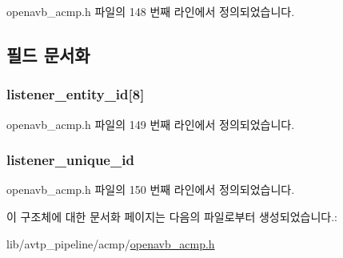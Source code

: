 openavb\+\_\+acmp.\+h 파일의 148 번째 라인에서 정의되었습니다.



\subsection{필드 문서화}
\subsubsection[{\texorpdfstring{listener\+\_\+entity\+\_\+id}{listener_entity_id}}]{ listener\+\_\+entity\+\_\+id\mbox{[}8\mbox{]}}\hypertarget{structopenavb__acmp___listener_pair__t_adc2799f499bfc317ee7d3a9182d1c71f}{}\label{structopenavb__acmp___listener_pair__t_adc2799f499bfc317ee7d3a9182d1c71f}


openavb\+\_\+acmp.\+h 파일의 149 번째 라인에서 정의되었습니다.

\subsubsection[{\texorpdfstring{listener\+\_\+unique\+\_\+id}{listener_unique_id}}]{ listener\+\_\+unique\+\_\+id}\hypertarget{structopenavb__acmp___listener_pair__t_adf094f0d101f97a77306253aa7c650e6}{}\label{structopenavb__acmp___listener_pair__t_adf094f0d101f97a77306253aa7c650e6}


openavb\+\_\+acmp.\+h 파일의 150 번째 라인에서 정의되었습니다.



이 구조체에 대한 문서화 페이지는 다음의 파일로부터 생성되었습니다.\+:\begin{DoxyCompactItemize}
\item 
lib/avtp\+\_\+pipeline/acmp/\hyperlink{openavb__acmp_8h}{openavb\+\_\+acmp.\+h}\end{DoxyCompactItemize}

